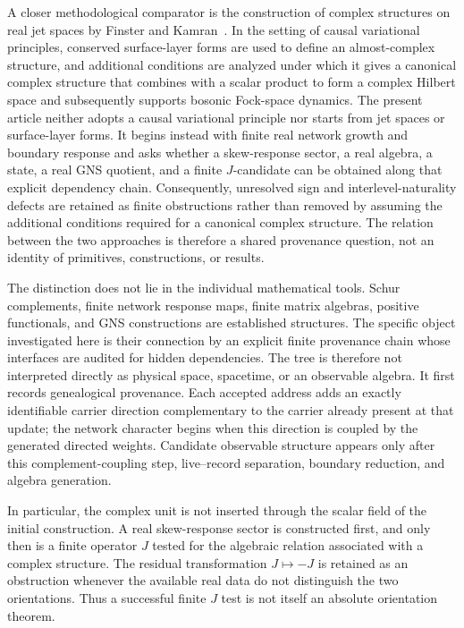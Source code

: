 \documentclass[11pt]{article}
\theoremstyle{remark}
\numberwithin{equation}{section}
\begin{document}
A closer methodological comparator is the construction of complex structures on real jet spaces by Finster and Kamran~\cite{FinsterKamran2021}. In the setting of causal variational principles, conserved surface-layer forms are used to define an almost-complex structure, and additional conditions are analyzed under which it gives a canonical complex structure that combines with a scalar product to form a complex Hilbert space and subsequently supports bosonic Fock-space dynamics. The present article neither adopts a causal variational principle nor starts from jet spaces or surface-layer forms. It begins instead with finite real network growth and boundary response and asks whether a skew-response sector, a real algebra, a state, a real GNS quotient, and a finite $J$-candidate can be obtained along that explicit dependency chain. Consequently, unresolved sign and interlevel-naturality defects are retained as finite obstructions rather than removed by assuming the additional conditions required for a canonical complex structure. The relation between the two approaches is therefore a shared provenance question, not an identity of primitives, constructions, or results.

The distinction does not lie in the individual mathematical tools. Schur complements, finite network response maps, finite matrix algebras, positive functionals, and GNS constructions are established structures. The specific object investigated here is their connection by an explicit finite provenance chain whose interfaces are audited for hidden dependencies. The tree is therefore not interpreted directly as physical space, spacetime, or an observable algebra. It first records genealogical provenance. Each accepted address adds an exactly identifiable carrier direction complementary to the carrier already present at that update; the network character begins when this direction is coupled by the generated directed weights. Candidate observable structure appears only after this complement-coupling step, live--record separation, boundary reduction, and algebra generation.

In particular, the complex unit is not inserted through the scalar field of the initial construction. A real skew-response sector is constructed first, and only then is a finite operator $J$ tested for the algebraic relation associated with a complex structure. The residual transformation $J\mapsto-J$ is retained as an obstruction whenever the available real data do not distinguish the two orientations. Thus a successful finite $J$ test is not itself an absolute orientation theorem.
\end{document}
